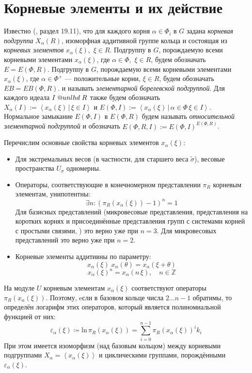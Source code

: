 \documentclass[12pt]{matmex-diploma}
\makeatletter
\newcommand{\slunlhd}{%
  \mathrel{\mathpalette\sl@unlhd\relax}%
}
\newcommand{\sl@unlhd}[2]{%
  \sbox\z@{$#1\lhd$}%
  \sbox\tw@{$#1\leqslant$}%
  \dimen@=\ht\tw@
  \advance\dimen@-\ht\z@
  \ifx#1\displaystyle
    \advance\dimen@ .2pt
  \else
    \ifx#1\textstyle
      \advance\dimen@ .2pt
    \fi
  \fi
  \ooalign{\raisebox{\dimen@}{$\m@th#1\lhd$}\cr$\m@th#1\leqslant$\cr}%
}
\theoremstyle{mystyleni}
\theoremstyle{mystyle}
\newcommand{\Z}{\mathbb{Z}}
\renewcommand{\trianglelefteq}{\slunlhd}
\makeatother
\begin{document}
\section{Корневые элементы и их действие}

Известно (\citep{Milne2017}, раздел 19.11), что для каждого корня $\alpha \in \Phi_i$ в $G$ задана \emph{корневая подгруппа} $X_\alpha(R)$, изоморфная аддитивной группе кольца и состоящая из \emph{корневых элементов} $x_\alpha(\xi)$,~$\xi \in R$. Подгруппу в $G$, порождаемую всеми корневыми элементами $x_\alpha(\xi)$, где $\alpha \in \Phi$,~$\xi \in R$, будем обозначать $E = E(\Phi,R)$. 
Подгруппу в $G$, порождаемую всеми корневыми элементами $x_\alpha(\xi)$, где $\alpha \in \Phi^+$ --- положительные корни, $\xi \in R$, будем обозначать $EB = EB(\Phi,R)$. и называть \emph{элементарной борелевской  подгруппой}.
Для каждого идеала $I \trianglelefteq R$ также будем обозначать
$X_\alpha(I) := \left<x_\alpha(\xi) \,|\, \xi \in I\right>$ и $E(\Phi,I) := \left<x_\alpha(\xi) \,|\, \alpha \in \Phi \, \xi \in I\right>$. Нормальное замыкание $E(\Phi,I)$ в $E(\Phi,R)$ будем называть \emph{относительной элементарной подгруппой} и обозначать $E(\Phi,R,I):=E(\Phi,I)^{E(\Phi,R)}$.

Перечислим основные свойства корневых элементов $x_\alpha(\xi)$:
\begin{itemize}[label={\LARGE\raisebox{-0.4ex}{\textbullet}\;},leftmargin=2\parindent]
\item
Для экстремальных весов (в частности, для старшего веса $\widetilde\sigma$), весовые пространства $U_\sigma$ одномерны.
\item
Операторы, соответствующие в конечномерном представлении $\pi_R$ корневым элементам, унипотентны:
$$\exists n : (\pi_R(x_\alpha(\xi))-1)^n = 1$$
Для базисных представлений (микровесовые представления, представления на коротких корнях и присоединённые представления групп с системами корней с простыми связями, \cite{Plotkin1998}) это верно уже при $n=3$. Для микровесовых представлений это верно уже при $n=2$.
\item
Корневые элементы аддитивны по параметру:
$$x_\alpha(\xi) \; x_\alpha(\theta)  = x_\alpha(\xi+\theta)$$
$$x_\alpha(\xi)^n = x_\alpha(n \, \xi), \quad n \in \Z$$
\end{itemize}

На модуле $U$ корневым элементам $x_\alpha(\xi)$ соответствуют операторы $\pi_R(x_\alpha(\xi))$. Поэтому, eсли в базовом кольце числа $2 \ldots n-1$ обратимы, то определён логарифм этих операторов, который является полиномиальной функцией от них:
$$ \varepsilon_\alpha(\xi) \coloneqq \mathrm{ln} \, \pi_R(x_\alpha(\xi)) = \sum_{i=0}^{n-1} {\pi_R(x_\alpha(\xi))^i k_i} $$
При этом имеется изоморфизм (над базовым кольцом) между корневыми подгруппами $X_\alpha=\left<x_\alpha(\xi)\right>$ и циклическими группами, порождёнными $\varepsilon_\alpha(\xi)$.
\end{document}

